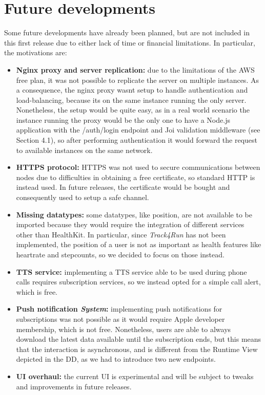 \documentclass[titlepage]{article}
\begin{document}
	\pagebreak
	\section{Future developments}
	Some future developments have already been planned, but are not included in this first release due to either lack of time or financial limitations. In particular, the motivations are:
	
	\begin{itemize}
		\item {\bf Nginx proxy and server replication:}
		due to the limitations of the AWS free plan, it was not possible to replicate the server on multiple instances. As a consequence, the nginx proxy wasn\textsc{}t setup to handle authentication and load-balancing, because it\textsc{}s on the same instance running the only server. Nonetheless, the setup would be quite easy, as in a real world scenario the instance running the proxy would be the only one to have a Node.js application with the /auth/login endpoint and Joi validation middleware (see Section 4.1), so after performing authentication it would forward the request to available instances on the same network.
		
		\item {\bf HTTPS protocol:}
		HTTPS was not used to secure communications between nodes due to difficulties in obtaining a free certificate, so standard HTTP is instead used. In future releases, the certificate would be bought and consequently used to setup a safe channel.
		
		\item{\bf Missing datatypes:}
		some datatypes, like position, are not available to be imported because they would require the integration of different services other than HealthKit. In particular, since {\it {\it Track4Run}} has not been implemented, the position of a user is not as important as health features like heartrate and stepcounts, so we decided to focus on those instead.
		
		\item {\bf TTS service:}
		implementing a TTS service able to be used during phone calls requires subscription services, so we instead opted for a simple call alert, which is free.
		
		\item {\bf Push notification {\it System}:}
		implementing push notifications for subscriptions was not possible as it would require Apple developer membership, which is not free. Nonetheless, users are able to always download the latest data available until the subscription ends, but this means that the interaction is asynchronous, and is different from the Runtime View depicted in the DD, as we had to introduce two new endpoints.
		
		\item {\bf UI overhaul:} 
		the current UI is experimental and will be subject to tweaks and improvements in future releases.
		
	\end{itemize}
	
\end{document}
